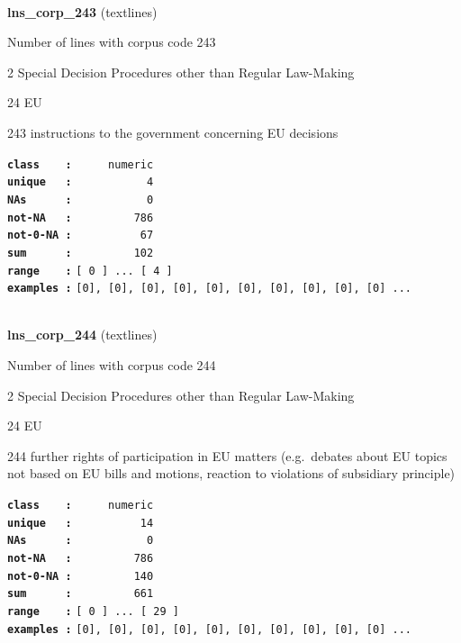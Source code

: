\documentclass[]{article}
\begin{document}
~

\textbf{lns\_corp\_243} (textlines)

Number of lines with corpus code 243

2 Special Decision Procedures other than Regular Law-Making

24 EU

243 instructions to the government concerning EU decisions

\textbf{\texttt{class\ \ \ \ :}} \texttt{~~~~~numeric}\\
\textbf{\texttt{unique\ \ \ :}} \texttt{~~~~~~~~~~~4}\\
\textbf{\texttt{NAs\ \ \ \ \ \ :}} \texttt{~~~~~~~~~~~0}\\
\textbf{\texttt{not-NA\ \ \ :}} \texttt{~~~~~~~~~786}\\
\textbf{\texttt{not-0-NA\ :}} \texttt{~~~~~~~~~~67}\\
\textbf{\texttt{sum\ \ \ \ \ \ :}} \texttt{~~~~~~~~~102}\\
\textbf{\texttt{range\ \ \ \ :}}
\texttt{{[}\ 0\ {]}\ ...\ {[}\ 4\ {]}}\\
\textbf{\texttt{examples\ :}}
\texttt{{[}0{]},\ {[}0{]},\ {[}0{]},\ {[}0{]},\ {[}0{]},\ {[}0{]},\ {[}0{]},\ {[}0{]},\ {[}0{]},\ {[}0{]}\ ...}\\

~

\textbf{lns\_corp\_244} (textlines)

Number of lines with corpus code 244

2 Special Decision Procedures other than Regular Law-Making

24 EU

244 further rights of participation in EU matters (e.g.~debates about EU
topics not based on EU bills and motions, reaction to violations of
subsidiary principle)

\textbf{\texttt{class\ \ \ \ :}} \texttt{~~~~~numeric}\\
\textbf{\texttt{unique\ \ \ :}} \texttt{~~~~~~~~~~14}\\
\textbf{\texttt{NAs\ \ \ \ \ \ :}} \texttt{~~~~~~~~~~~0}\\
\textbf{\texttt{not-NA\ \ \ :}} \texttt{~~~~~~~~~786}\\
\textbf{\texttt{not-0-NA\ :}} \texttt{~~~~~~~~~140}\\
\textbf{\texttt{sum\ \ \ \ \ \ :}} \texttt{~~~~~~~~~661}\\
\textbf{\texttt{range\ \ \ \ :}}
\texttt{{[}\ 0\ {]}\ ...\ {[}\ 29\ {]}}\\
\textbf{\texttt{examples\ :}}
\texttt{{[}0{]},\ {[}0{]},\ {[}0{]},\ {[}0{]},\ {[}0{]},\ {[}0{]},\ {[}0{]},\ {[}0{]},\ {[}0{]},\ {[}0{]}\ ...}\\
\end{document}
